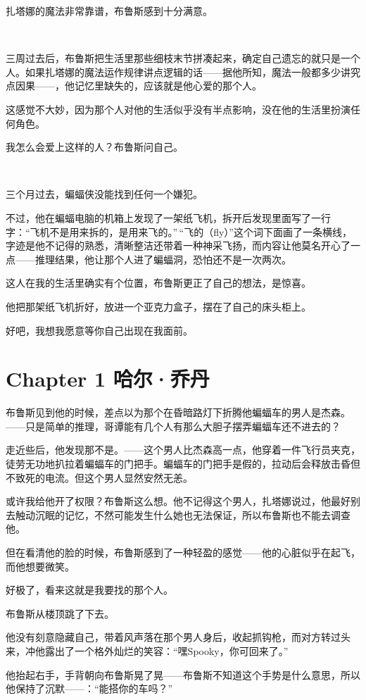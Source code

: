 \documentclass[../main.tex]{subfiles}
\begin{document}
扎塔娜的魔法非常靠谱，布鲁斯感到十分满意。

~\

三周过去后，布鲁斯把生活里那些细枝末节拼凑起来，确定自己遗忘的就只是一个人。如果扎塔娜的魔法运作规律讲点逻辑的话——据他所知，魔法一般都多少讲究点因果——，他记忆里缺失的，应该就是他心爱的那个人。

这感觉不大妙，因为那个人对他的生活似乎没有半点影响，没在他的生活里扮演任何角色。

我怎么会爱上这样的人？布鲁斯问自己。

~\

三个月过去，蝙蝠侠没能找到任何一个嫌犯。

不过，他在蝙蝠电脑的机箱上发现了一架纸飞机，拆开后发现里面写了一行字：“飞机不是用来拆的，是用来飞的。”\,“飞的（fly）”这个词下面画了一条横线，字迹是他不记得的熟悉，清晰整洁还带着一种神采飞扬，而内容让他莫名开心了一点——推理结果，他让那个人进了蝙蝠洞，恐怕还不是一次两次。

这人在我的生活里确实有个位置，布鲁斯更正了自己的想法，是惊喜。

他把那架纸飞机折好，放进一个亚克力盒子，摆在了自己的床头柜上。

好吧，我想我愿意等你自己出现在我面前。

\section*{Chapter 1\hspace{1em} 哈尔·乔丹}

布鲁斯见到他的时候，差点以为那个在昏暗路灯下折腾他蝙蝠车的男人是杰森。——只是简单的推理，哥谭能有几个人有那么大胆子摆弄蝙蝠车还不进去的？

走近些后，他发现那不是。——这个男人比杰森高一点，他穿着一件飞行员夹克，徒劳无功地扒拉着蝙蝠车的门把手。蝙蝠车的门把手是假的，拉动后会释放击昏但不致死的电流。但这个男人显然安然无恙。

或许我给他开了权限？布鲁斯这么想。他不记得这个男人，扎塔娜说过，他最好别去触动沉眠的记忆，不然可能发生什么她也无法保证，所以布鲁斯也不能去调查他。

但在看清他的脸的时候，布鲁斯感到了一种轻盈的感觉——他的心脏似乎在起飞，而他想要微笑。

好极了，看来这就是我要找的那个人。

布鲁斯从楼顶跳了下去。

他没有刻意隐藏自己，带着风声落在那个男人身后，收起抓钩枪，而对方转过头来，冲他露出了一个格外灿烂的笑容：“嘿Spooky，你可回来了。”

他抬起右手，手背朝向布鲁斯晃了晃——布鲁斯不知道这个手势是什么意思，所以他保持了沉默——：“能搭你的车吗？”
\end{document}
